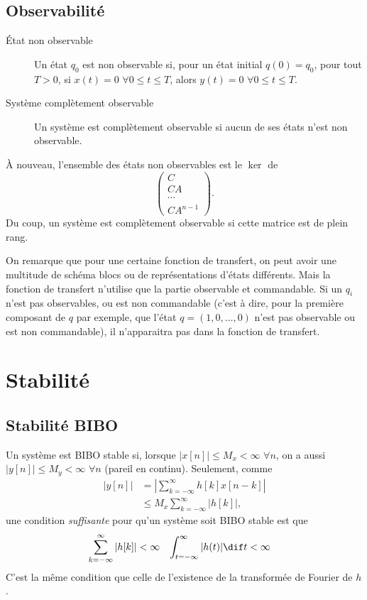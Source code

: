 \subsection{Observabilité}
\begin{description}
  \item[État non observable]
    Un état $q_0$ est non observable si,
    pour un état initial $q(0) = q_0$,
    pour tout $T > 0$, si $x(t) = 0$ $\forall 0 \leq t \leq T$, alors
    $y(t) = 0$ $\forall 0 \leq t \leq T$.
  \item[Système complètement observable]
    Un système est complètement observable si aucun de ses états n'est
    non observable.
\end{description}

À nouveau, l'ensemble des états non observables est le $\ker$ de
\[ \begin{pmatrix}C\\CA\\\cdots\\CA^{n-1}\end{pmatrix}. \]
Du coup, un système est complètement observable si cette matrice est de
plein rang.

On remarque que pour une certaine fonction de transfert,
on peut avoir une multitude de schéma blocs ou de représentations d'états
différents.
Mais la fonction de transfert n'utilise
que la partie observable et commandable.
Si un $q_i$ n'est pas observables, ou est non commandable
(c'est à dire, pour la première composant de $q$ par exemple, que l'état
$q = (1, 0, \ldots, 0)$ n'est pas observable ou est non commandable),
il n'apparaitra pas
dans la fonction de transfert.

\section{Stabilité}
\subsection{Stabilité BIBO}
Un système est BIBO stable si,
lorsque $|x[n]| \leq M_x < \infty$ $\forall n$,
on a aussi $|y[n]| \leq M_y < \infty$ $\forall n$ (pareil en continu).
Seulement, comme
\begin{align*}
  |y[n]| & = \left|\sum_{k=-\infty}^{\infty}h[k]x[n-k]\right|\\
         & \leq M_x \sum_{k=-\infty}^{\infty}|h[k]|,
\end{align*}
une condition \emph{suffisante} pour qu'un système soit BIBO stable est que
\begin{align*}
  \sum_{k=-\infty}^\infty |h[k]| & < \infty &
  \int_{t=-\infty}^\infty |h(t)| \dif t & < \infty
\end{align*}
C'est la même condition que celle de l'existence de la transformée de Fourier
de $h$.

